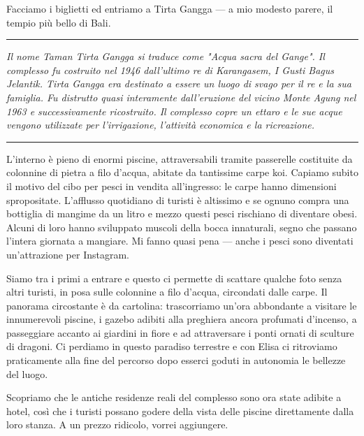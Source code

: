 Facciamo i biglietti ed entriamo a Tirta Gangga — a mio modesto parere, il tempio più bello di Bali.

\begin{center}
    \noindent\rule{0.6\textwidth}{0.4pt}
\end{center}

\textit{Il nome Taman Tirta Gangga si traduce come "Acqua sacra del Gange". Il complesso fu costruito nel 1946 dall'ultimo re di Karangasem, I Gusti Bagus Jelantik. Tirta Gangga era destinato a essere un luogo di svago per il re e la sua famiglia. Fu distrutto quasi interamente dall'eruzione del vicino Monte Agung nel 1963 e successivamente ricostruito. Il complesso copre un ettaro e le sue acque vengono utilizzate per l'irrigazione, l'attività economica e la ricreazione.}

\begin{center}
    \noindent\rule{0.6\textwidth}{0.4pt}
\end{center}

L'interno è pieno di enormi piscine, attraversabili tramite passerelle costituite da colonnine di pietra a filo d'acqua, abitate da tantissime carpe koi. Capiamo subito il motivo del cibo per pesci in vendita all'ingresso: le carpe hanno dimensioni spropositate. L'afflusso quotidiano di turisti è altissimo e se ognuno compra una bottiglia di mangime da un litro e mezzo questi pesci rischiano di diventare obesi. Alcuni di loro hanno sviluppato muscoli della bocca innaturali, segno che passano l'intera giornata a mangiare. Mi fanno quasi pena — anche i pesci sono diventati un'attrazione per Instagram.

Siamo tra i primi a entrare e questo ci permette di scattare qualche foto senza altri turisti, in posa sulle colonnine a filo d'acqua, circondati dalle carpe. Il panorama circostante è da cartolina: trascorriamo un'ora abbondante a visitare le innumerevoli piscine, i gazebo adibiti alla preghiera ancora profumati d'incenso, a passeggiare accanto ai giardini in fiore e ad attraversare i ponti ornati di sculture di dragoni. Ci perdiamo in questo paradiso terrestre e con Elisa ci ritroviamo praticamente alla fine del percorso dopo esserci goduti in autonomia le bellezze del luogo.

Scopriamo che le antiche residenze reali del complesso sono ora state adibite a hotel, così che i turisti possano godere della vista delle piscine direttamente dalla loro stanza. A un prezzo ridicolo, vorrei aggiungere.

